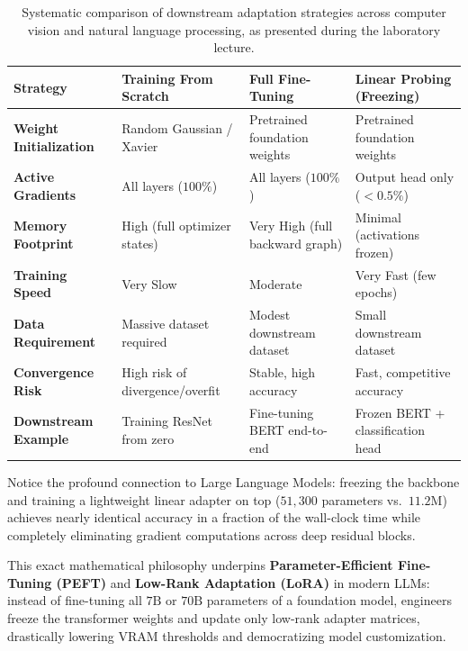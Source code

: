 \documentclass[../labs.tex]{subfiles}
\begin{document}
\begin{table}[htbp]
\centering
\small
\begin{tabularx}{\textwidth}{>{\bfseries}l >{\raggedright}X >{\raggedright}X >{\raggedright\arraybackslash}X}
\toprule
\textbf{Strategy} & \textbf{Training From Scratch} & \textbf{Full Fine-Tuning} & \textbf{Linear Probing (Freezing)} \\
\midrule
Weight Initialization & Random Gaussian / Xavier & Pretrained foundation weights & Pretrained foundation weights \\
Active Gradients & All layers ($100\%$) & All layers ($100\%$) & Output head only ($< 0.5\%$) \\
Memory Footprint & High (full optimizer states) & Very High (full backward graph) & Minimal (activations frozen) \\
Training Speed & Very Slow & Moderate & Very Fast (few epochs) \\
Data Requirement & Massive dataset required & Modest downstream dataset & Small downstream dataset \\
Convergence Risk & High risk of divergence/overfit & Stable, high accuracy & Fast, competitive accuracy \\
Downstream Example & Training ResNet from zero & Fine-tuning BERT end-to-end & Frozen BERT + classification head \\
\bottomrule
\end{tabularx}
\caption{Systematic comparison of downstream adaptation strategies across computer vision and natural language processing, as presented during the laboratory lecture.}
\label{tab:adaptation_strategies}
\end{table}

\begin{intuition}
Notice the profound connection to Large Language Models: freezing the backbone and training a lightweight linear adapter on top ($51{,}300$ parameters vs.\ $11.2\text{M}$) achieves nearly identical accuracy in a fraction of the wall-clock time while completely eliminating gradient computations across deep residual blocks.

This exact mathematical philosophy underpins \textbf{Parameter-Efficient Fine-Tuning (PEFT)} and \textbf{Low-Rank Adaptation (LoRA)} in modern LLMs: instead of fine-tuning all $7\text{B}$ or $70\text{B}$ parameters of a foundation model, engineers freeze the transformer weights and update only low-rank adapter matrices, drastically lowering VRAM thresholds and democratizing model customization.
\end{intuition}
\end{document}
